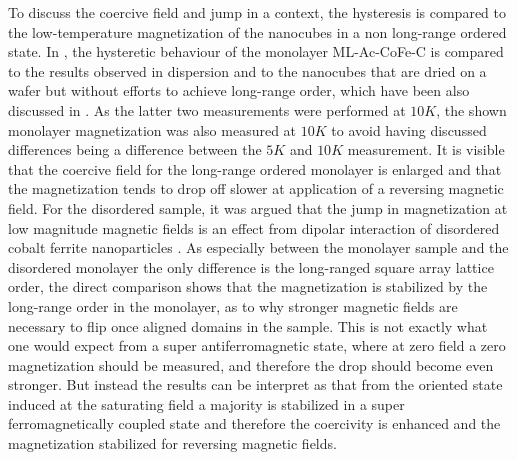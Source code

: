 \documentclass[\main/dresen_thesis.tex]{subfiles}
\begin{document}
  To discuss the coercive field and jump in a context, the hysteresis is compared to the low-temperature magnetization of the nanocubes in a non long-range ordered state.
  In , the hysteretic behaviour of the monolayer ML-Ac-CoFe-C is compared to the results observed in dispersion and to the nanocubes that are dried on a wafer but without efforts to achieve long-range order, which have been also discussed in .
  As the latter two measurements were performed at $10 \unit{K}$, the shown monolayer magnetization was also measured at $10 \unit{K}$ to avoid having discussed differences being a difference between the $5 \unit{K}$ and $10 \unit{K}$ measurement.
  It is visible that the coercive field for the long-range ordered monolayer is enlarged and that the magnetization tends to drop off slower at application of a reversing magnetic field.
  For the disordered sample, it was argued that the jump in magnetization at low magnitude magnetic fields is an effect from dipolar interaction of disordered cobalt ferrite nanoparticles \cite{Alves_2017_Waspw}.
  As especially between the monolayer sample and the disordered monolayer the only difference is the long-ranged square array lattice order, the direct comparison shows that the magnetization is stabilized by the long-range order in the monolayer, as to why stronger magnetic fields are necessary to flip once aligned domains in the sample.
  This is not exactly what one would expect from a super antiferromagnetic state, where at zero field a zero magnetization should be measured, and therefore the drop should become even stronger.
  But instead the results can be interpret as that from the oriented state induced at the saturating field a majority is stabilized in a super ferromagnetically coupled state and therefore the coercivity is enhanced and the magnetization stabilized for reversing magnetic fields.
\end{document}

